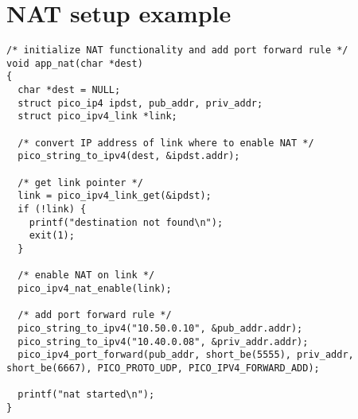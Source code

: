 \section{NAT setup example}

\begin{verbatim}
/* initialize NAT functionality and add port forward rule */
void app_nat(char *dest)
{
  char *dest = NULL;
  struct pico_ip4 ipdst, pub_addr, priv_addr;
  struct pico_ipv4_link *link;

  /* convert IP address of link where to enable NAT */
  pico_string_to_ipv4(dest, &ipdst.addr);
  
  /* get link pointer */
  link = pico_ipv4_link_get(&ipdst);
  if (!link) {
    printf("destination not found\n");
    exit(1);
  }
  
  /* enable NAT on link */
  pico_ipv4_nat_enable(link);
  
  /* add port forward rule */
  pico_string_to_ipv4("10.50.0.10", &pub_addr.addr);
  pico_string_to_ipv4("10.40.0.08", &priv_addr.addr);
  pico_ipv4_port_forward(pub_addr, short_be(5555), priv_addr, short_be(6667), PICO_PROTO_UDP, PICO_IPV4_FORWARD_ADD);
  
  printf("nat started\n");
}
\end{verbatim}